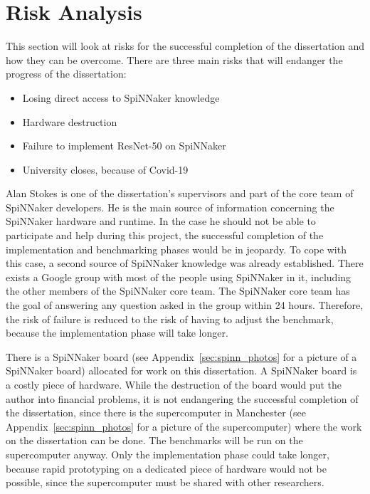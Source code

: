 \documentclass{article}
\begin{document}

\section{Risk Analysis} %
\label{sec:risk_analysis}

This section will look at risks for the successful
completion of the dissertation and how they can be
overcome.
There are three main risks that will endanger the progress
of the dissertation:
\begin{itemize}
  \item Losing direct access to SpiNNaker knowledge
  \item Hardware destruction
  \item Failure to implement ResNet-50 on SpiNNaker
  \item University closes, because of Covid-19
\end{itemize}

Alan Stokes is one of the dissertation's supervisors and part
of the core team of SpiNNaker developers.
He is the main source of information concerning the
SpiNNaker hardware and runtime.
In the case he should not be able to participate and help
during this project, the successful completion of the implementation
and benchmarking phases would be in jeopardy.
To cope with this case, a second source of SpiNNaker knowledge was
already established.
There exists a Google group with most of the people using SpiNNaker in
it, including the other members of the SpiNNaker core team.
The SpiNNaker core team has the goal of answering any question asked
in the group within 24 hours.
Therefore, the risk of failure is reduced to the risk of having to
adjust the benchmark, because the implementation phase will take
longer.

There is a SpiNNaker board (see
Appendix~\ref{sec:spinn_photos} for a picture of a
SpiNNaker board) allocated for work on this dissertation.
A SpiNNaker board is a costly piece of hardware.
While the destruction of the board would put the author
into financial problems, it is not endangering the
successful completion of the dissertation, since there is
the supercomputer in Manchester (see
Appendix~\ref{sec:spinn_photos} for a picture of the
supercomputer) where the work on the dissertation can be
done.
The benchmarks will be run on the supercomputer anyway.
Only the implementation phase could take longer, because
rapid prototyping on a dedicated piece of hardware would
not be possible, since the supercomputer must be shared
with other researchers.
\end{document}
